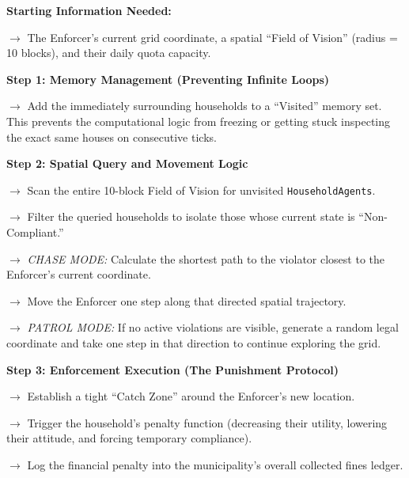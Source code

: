 \vspace{0.5cm} 
\begin{algorithm}[H]
\caption{The Enforcer's Daily Computational Patrol Process}
\label{alg:enforcement_patrol_english}
\begin{algorithmic}[1]
\State \textbf{Starting Information Needed:} 
\State \parbox[t]{0.9\linewidth}{$\rightarrow$ The Enforcer's current grid coordinate, a spatial ``Field of Vision'' (radius = 10 blocks), and their daily quota capacity.\strut}
\Statex
\State \textbf{Step 1: Memory Management (Preventing Infinite Loops)}
\State \parbox[t]{0.9\linewidth}{$\rightarrow$ Add the immediately surrounding households to a ``Visited'' memory set. This prevents the computational logic from freezing or getting stuck inspecting the exact same houses on consecutive ticks.\strut}
\Statex
\State \textbf{Step 2: Spatial Query and Movement Logic}
\State \parbox[t]{0.9\linewidth}{$\rightarrow$ Scan the entire 10-block Field of Vision for unvisited \texttt{HouseholdAgents}.\strut}
\State \parbox[t]{0.9\linewidth}{$\rightarrow$ Filter the queried households to isolate those whose current state is ``Non-Compliant.''\strut}
\Statex
{}
    \State \parbox[t]{0.88\linewidth}{$\rightarrow$ \textit{CHASE MODE:} Calculate the shortest path to the violator closest to the Enforcer's current coordinate.\strut}
    \State \parbox[t]{0.88\linewidth}{$\rightarrow$ Move the Enforcer one step along that directed spatial trajectory.\strut}
\Else
    \State \parbox[t]{0.88\linewidth}{$\rightarrow$ \textit{PATROL MODE:} If no active violations are visible, generate a random legal coordinate and take one step in that direction to continue exploring the grid.\strut}
\EndIf
\Statex
\State \textbf{Step 3: Enforcement Execution (The Punishment Protocol)}
\State \parbox[t]{0.9\linewidth}{$\rightarrow$ Establish a tight ``Catch Zone'' around the Enforcer's new location.\strut}
        \State \parbox[t]{0.85\linewidth}{$\rightarrow$ Trigger the household's penalty function (decreasing their utility, lowering their attitude, and forcing temporary compliance).\strut}
        \State \parbox[t]{0.85\linewidth}{$\rightarrow$ Log the financial penalty into the municipality's overall collected fines ledger.\strut}
    \EndIf
\EndFor
\end{algorithmic}
\end{algorithm}